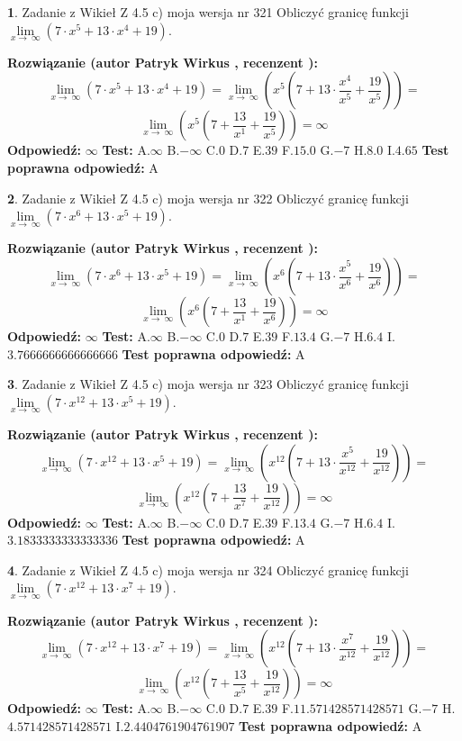 \documentclass[12pt, a4paper]{article}
\theoremstyle{definition} %
\newtheorem{zad}{}
\newcommand{\zadStart}[1]{\begin{zad}#1\newline}
\newcommand{\zadStop}{\end{zad}}
\newcommand{\rozwStart}[2]{\noindent \textbf{Rozwiązanie (autor #1 , recenzent #2): }\newline}
\newcommand{\rozwStop}{\newline}
\newcommand{\odpStart}{\noindent \textbf{Odpowiedź:}\newline}
\newcommand{\odpStop}{\newline}
\newcommand{\testStart}{\noindent \textbf{Test:}\newline}
\newcommand{\testStop}{\newline}
\newcommand{\kluczStart}{\noindent \textbf{Test poprawna odpowiedź:}\newline}
\newcommand{\kluczStop}{\newline}
\begin{document}
\zadStart{Zadanie z Wikieł Z 4.5 c) moja wersja nr 321}
Obliczyć granicę funkcji  $\lim\limits_{x\to\ \infty}(7 \cdot x^{5}+13 \cdot x^{4}+19)$.
\zadStop
\rozwStart{Patryk Wirkus}{}
$$\lim\limits_{x\to\ \infty}(7 \cdot x^{5}+13 \cdot x^{4}+19) = \lim\limits_{x\to\ \infty}(x^{5}(7 +13 \cdot \frac{x^{4}}{x^{5}}+\frac{19}{x^{5}})) =$$ $$\lim\limits_{x\to\ \infty}(x^{5}(7 +\frac{13}{x^{1}}+\frac{19}{x^{5}})) =\infty$$
\rozwStop
\odpStart
$\infty$
\odpStop
\testStart
A.$\infty$ B.$-\infty$ C.$0$ D.$7$ E.$39$
F.$15.0$ G.$-7$
H.$8.0$
I.$4.65$
\testStop
\kluczStart
A
\kluczStop



\zadStart{Zadanie z Wikieł Z 4.5 c) moja wersja nr 322}
Obliczyć granicę funkcji  $\lim\limits_{x\to\ \infty}(7 \cdot x^{6}+13 \cdot x^{5}+19)$.
\zadStop
\rozwStart{Patryk Wirkus}{}
$$\lim\limits_{x\to\ \infty}(7 \cdot x^{6}+13 \cdot x^{5}+19) = \lim\limits_{x\to\ \infty}(x^{6}(7 +13 \cdot \frac{x^{5}}{x^{6}}+\frac{19}{x^{6}})) =$$ $$\lim\limits_{x\to\ \infty}(x^{6}(7 +\frac{13}{x^{1}}+\frac{19}{x^{6}})) =\infty$$
\rozwStop
\odpStart
$\infty$
\odpStop
\testStart
A.$\infty$ B.$-\infty$ C.$0$ D.$7$ E.$39$
F.$13.4$ G.$-7$
H.$6.4$
I.$3.7666666666666666$
\testStop
\kluczStart
A
\kluczStop



\zadStart{Zadanie z Wikieł Z 4.5 c) moja wersja nr 323}
Obliczyć granicę funkcji  $\lim\limits_{x\to\ \infty}(7 \cdot x^{12}+13 \cdot x^{5}+19)$.
\zadStop
\rozwStart{Patryk Wirkus}{}
$$\lim\limits_{x\to\ \infty}(7 \cdot x^{12}+13 \cdot x^{5}+19) = \lim\limits_{x\to\ \infty}(x^{12}(7 +13 \cdot \frac{x^{5}}{x^{12}}+\frac{19}{x^{12}})) =$$ $$\lim\limits_{x\to\ \infty}(x^{12}(7 +\frac{13}{x^{7}}+\frac{19}{x^{12}})) =\infty$$
\rozwStop
\odpStart
$\infty$
\odpStop
\testStart
A.$\infty$ B.$-\infty$ C.$0$ D.$7$ E.$39$
F.$13.4$ G.$-7$
H.$6.4$
I.$3.1833333333333336$
\testStop
\kluczStart
A
\kluczStop



\zadStart{Zadanie z Wikieł Z 4.5 c) moja wersja nr 324}
Obliczyć granicę funkcji  $\lim\limits_{x\to\ \infty}(7 \cdot x^{12}+13 \cdot x^{7}+19)$.
\zadStop
\rozwStart{Patryk Wirkus}{}
$$\lim\limits_{x\to\ \infty}(7 \cdot x^{12}+13 \cdot x^{7}+19) = \lim\limits_{x\to\ \infty}(x^{12}(7 +13 \cdot \frac{x^{7}}{x^{12}}+\frac{19}{x^{12}})) =$$ $$\lim\limits_{x\to\ \infty}(x^{12}(7 +\frac{13}{x^{5}}+\frac{19}{x^{12}})) =\infty$$
\rozwStop
\odpStart
$\infty$
\odpStop
\testStart
A.$\infty$ B.$-\infty$ C.$0$ D.$7$ E.$39$
F.$11.571428571428571$ G.$-7$
H.$4.571428571428571$
I.$2.4404761904761907$
\testStop
\kluczStart
A
\kluczStop
\end{document}
